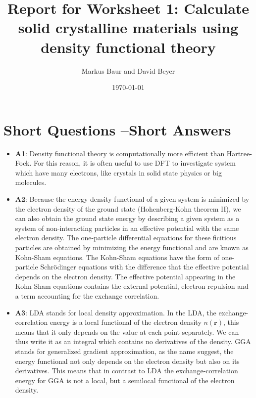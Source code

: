 \documentclass[a4paper,10pt,bibtotoc]{scrartcl}
\begin{document}
\titlehead{Simulation Methods in Physics II \hfill SS 2020}
\title{Report for Worksheet 1: Calculate solid crystalline materials using density functional theory}
\author{Markus Baur and David Beyer}
\date{\today}
\maketitle

\tableofcontents

\section{Short Questions --Short Answers}
\begin{itemize}
 \item \textbf{A1}: Density functional theory is computationally more efficient than Hartree-Fock. For this reason, it is often useful to use DFT to investigate system which have many electrons, like crystals in solid state physics or big molecules.
 
\item \textbf{A2}: Because the energy density functional of a given system is minimized by the electron density of the ground state (Hohenberg-Kohn theorem II), we can also obtain the ground state energy by describing a given system as a system of non-interacting particles in an effective potential with the same electron density. 
The one-particle differential equations for these ficitious particles are obtained by minimizing the energy functional and are known as Kohn-Sham equations. 
The Kohn-Sham equations have the form of one-particle Schrödinger equations with the difference that the effective potential depends on the electron density.
The effective potential appearing in the Kohn-Sham equations contains the external potential, electron repulsion and a term accounting for the exchange correlation.
 
 \item \textbf{A3}: LDA stands for local density approximation. In the LDA, the exchange-correlation energy is a local functional of the electron density $n\left(\mathbf{r}\right)$, this means that it only depends on the value at each point separately. 
 We can thus write it as an integral which contains no derivatives of the density. 
 GGA stands for generalized gradient approximation, as the name suggest, the energy functional not only depends on the electron density but also on its derivatives. 
 This means that in contrast to LDA the exchange-correlation energy for GGA is not a local, but a semilocal functional of the electron density.


\end{itemize}
\end{document}
